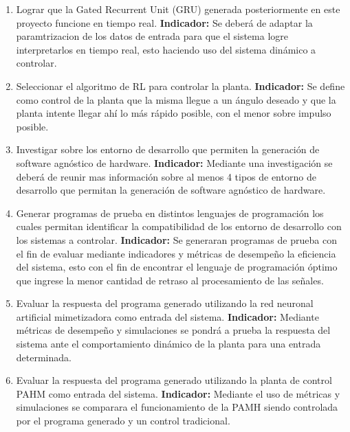 \documentclass[12pt]{article}
\begin{document}
\begin{enumerate}
    \item Lograr que la Gated Recurrent Unit (GRU) generada posteriormente en este proyecto funcione en tiempo real.\newline
    \textbf{Indicador:} Se deberá de adaptar la paramtrizacion de los datos de entrada para que el sistema logre interpretarlos en tiempo real, esto haciendo uso del sistema dinámico a controlar.
    
    \item Seleccionar el algoritmo de RL para controlar la planta.\newline
    \textbf{Indicador:} Se define como control de la planta que la misma llegue a un ángulo deseado y que la planta intente llegar ahí lo más rápido posible, con el menor sobre impulso posible.  


    \item Investigar sobre los  entorno de desarrollo que permiten la generación de software agnóstico de hardware.\newline
    \textbf{Indicador:} Mediante una investigación se deberá de reunir mas información sobre al menos 4 tipos de  entorno de desarrollo que permitan la generación de software agnóstico de hardware.

    \item Generar programas de prueba en distintos lenguajes de programación los cuales permitan identificar la compatibilidad de los  entorno de desarrollo con los sistemas a controlar.\newline
    \textbf{Indicador:} Se generaran programas de prueba con el fin de evaluar mediante indicadores y métricas de desempeño la eficiencia del sistema, esto con el fin de encontrar el lenguaje de programación óptimo que ingrese la menor cantidad de retraso al procesamiento de las señales.

    \item Evaluar la respuesta del programa generado utilizando la red neuronal artificial mimetizadora como entrada del sistema.\newline
    \textbf{Indicador:} Mediante métricas de desempeño y simulaciones se pondrá a prueba la respuesta del sistema ante el comportamiento dinámico de la planta para una entrada determinada.

    \item Evaluar la respuesta del programa generado utilizando la planta de control PAHM como entrada del sistema.\newline
    \textbf{Indicador:} Mediante el uso de métricas y simulaciones se comparara el funcionamiento de la PAMH siendo controlada por el programa generado y un control tradicional.
\end{enumerate}
\end{document}

